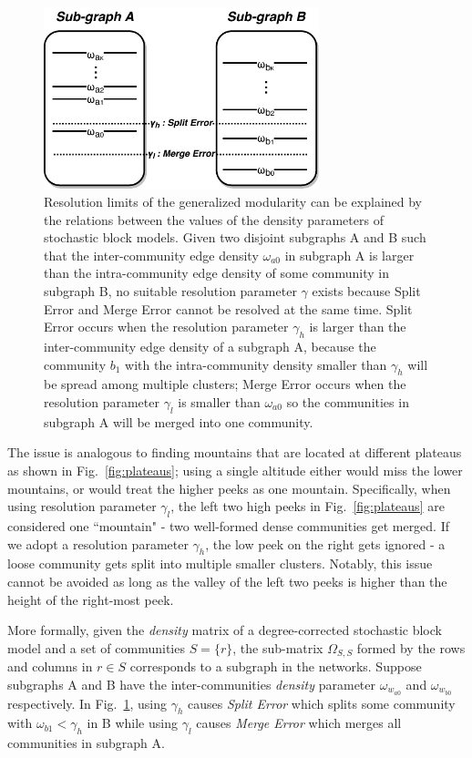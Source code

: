 \begin{figure}
    \centering
    \includegraphics[width=8cm]{img/chap2/gamma_error.pdf}
    \caption{Resolution limits of the generalized modularity can be explained by the relations between the values of the density parameters of stochastic block models. Given two disjoint subgraphs A and B such that the inter-community edge density $\omega_{a0}$ in subgraph A is larger than the intra-community edge density of some community in subgraph B, no suitable resolution parameter $\gamma$ exists because Split Error and Merge Error cannot be resolved at the same time. Split Error occurs when the resolution parameter $\gamma_h$ is larger than the inter-community edge density of a subgraph A, because the community $b_1$ with the intra-community density smaller than $\gamma_h$ will be spread among multiple clusters; Merge Error occurs when the resolution parameter $\gamma_l$ is smaller than $\omega_{a0}$ so the communities in subgraph A will be merged into one community.}
    \label{fig:gamma_error}
\end{figure}

The issue is analogous to finding mountains that are located at different plateaus as shown in Fig.~\ref{fig:plateaus}; using a single altitude either would miss the lower mountains, or would treat the higher peeks as one mountain. Specifically, when using resolution parameter $\gamma_l$, the left two high peeks in Fig.~\ref{fig:plateaus} are considered one ``mountain" - two well-formed dense communities get merged. If we adopt a resolution parameter $\gamma_h$, the low peek on the right gets ignored - a loose community gets split into multiple smaller clusters. Notably, this issue cannot be avoided as long as the valley of the left two peeks is higher than the height of the right-most peek. 

More formally, given the {\it density} matrix of a degree-corrected stochastic block model and a set of communities $S=\{r\}$, the sub-matrix $\Omega_{S,S}$ formed by the rows and columns in $r\in S$ corresponds to a subgraph in the networks. Suppose subgraphs A and B have the inter-communities {\it density} parameter $\omega_{w_{a0}}$ and $\omega_{w_{b0}}$ respectively. In Fig.~\ref{fig:gamma_error}, using $\gamma_h$ causes {\it Split Error} which splits some community with $\omega_{b1} < \gamma_h$ in  B while using $\gamma_l$ causes {\it Merge Error} which merges all communities in subgraph A.

